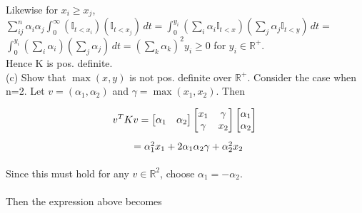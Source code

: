 \documentclass[18pt]{article}
\begin{document}
\begin{flushleft}
    \vspace{.4cm}
    Likewise for $ x_i \geq x_j$,\\
    \vspace{.4cm}
    $\sum_{ij}^n \alpha_i \alpha_j \int_{0}^{\infty} (\mathbb{I}_{t<x_i}) (\mathbb{I}_{t<x_j}) \,dt=\int_{0}^{y_i} (\sum_i \alpha_i \mathbb{I}_{t<x}) (\sum_j \alpha_j \mathbb{I}_{t<y}) \,dt=$\\
    $\int_0^{y_i} (\sum_i \alpha_i)(\sum_j \alpha_j) \,dt=(\sum_k \alpha_k)^2 y_i \geq 0$ for $y_i \in \mathbb{R}^{+}$.\\
    \vspace{.4cm}
    Hence K is pos. definite.\\
    \vspace{.4cm}
    (c) Show that $\max(x,y)$ is not pos. definite over $\mathbb{R}^{+}$.
    \vspace{.4cm}
    Consider the case when n=2. Let $v=(\alpha_1,\alpha_2)$ and $\gamma=\max(x_1,x_2)$. Then\\
    \end{flushleft}
    $$ v^T K v=
    \begin{bmatrix} \alpha_1 & \alpha_2 \end{bmatrix}
        \begin{bmatrix} x_1 & \gamma\\
                        \gamma & x_2 \end{bmatrix}
    \begin{bmatrix} \alpha_1 \\ \alpha_2 \end{bmatrix}\\
    $$
    $\hspace{4.5cm} =\alpha_1^2 x_1 + 2 \alpha_1 \alpha_2 \gamma + \alpha_2^2 x_2$\\
    \vspace{.4cm}
    \\
    Since this must hold for any $v \in \mathbb{R}^2$, choose $\alpha_1=-\alpha_2$.\\
    \\
    Then the expression above becomes\\
\end{document}
